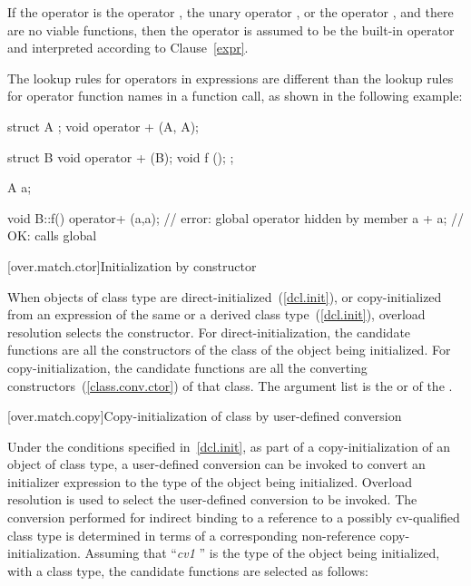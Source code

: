 \pnum
If the operator is the operator
\tcode{,},
the unary operator
\tcode{\&},
or the operator
\tcode{->},
and there are no viable functions, then the operator is
assumed to be the built-in operator and interpreted according to
Clause~\ref{expr}.

\pnum
\enternote
The lookup rules for operators in expressions are different than
the lookup
rules for operator function names in a function call, as shown in the following
example:

\begin{codeblock}
struct A { };
void operator + (A, A);

struct B {
  void operator + (B);
  void f ();
};

A a;

void B::f() {
  operator+ (a,a);              // error: global operator hidden by member
  a + a;                        // OK: calls global 
}
\end{codeblock}
\exitnote

[over.match.ctor]{Initialization by constructor}%

\pnum
When objects of class type are direct-initialized~(\ref{dcl.init}),
or copy-initialized from an expression of the same or a
derived class type~(\ref{dcl.init}),
overload
resolution selects the constructor.
For direct-initialization, the
candidate functions are
all the constructors of the class of the object being
initialized.
For copy-initialization, the candidate functions are all
the converting constructors~(\ref{class.conv.ctor}) of that
class.
The argument list is the
 or 
of the .

[over.match.copy]{Copy-initialization of class by user-defined conversion}%

\pnum
Under the conditions specified in~\ref{dcl.init}, as
part of a copy-initialization of an object of class type, a user-defined
conversion can be invoked to convert an initializer expression to the
type of the object being initialized.
Overload resolution is used
to select the user-defined conversion to be invoked.
\enternote The conversion performed for indirect binding to a reference to a possibly
cv-qualified class type is determined in terms of a corresponding non-reference
copy-initialization. \exitnote
Assuming that
``\textit{cv1} '' is the type of the object being initialized, with
a class type,
the candidate functions are selected as follows:

